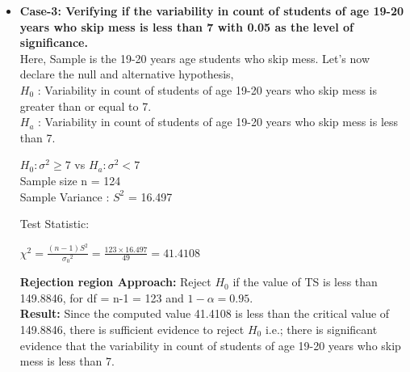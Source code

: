 \documentclass{article}
\begin{document}
\begin{itemize}
\item{\textbf{Case-3: Verifying if the variability in count of students of age 19-20 years who skip mess is less than 7 with 0.05 as the level of significance.}}\\
Here, Sample is the 19-20 years age students who skip mess.
Let's now declare the null and alternative hypothesis,\\
$H_0$ : Variability in count of students of age 19-20 years who skip mess is greater than or equal to 7.\\
$H_a$ : Variability in count of students of age 19-20 years who skip mess is less than 7.
\begin{center}
$H_0 : \sigma^2 \geq 7$ vs $H_a : \sigma^2 < 7$\\
Sample size n = 124\\
Sample Variance : $S^2$ = 16.497
\end{center}
Test Statistic:
\begin{center}
$\chi^2 = \frac{(n-1){S^2}}{{\sigma_0}^2} = \frac{123\times16.497}{49} = 41.4108$
\end{center}
\textbf{Rejection region Approach:} 
Reject $H_0$ if the value of TS is less than 149.8846, for df = n-1 = 123 and $1 - \alpha = 0.95$.\\
\textbf{Result:}
Since the computed value 41.4108 is less than the critical value of 149.8846, there is sufficient evidence to reject $H_0$ i.e.; there is significant evidence that the variability in count of students of age 19-20 years who skip mess is less than 7.\\


\end{itemize}
\end{document}
